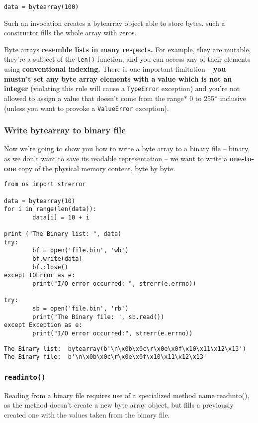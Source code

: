 \documentclass[11pt]{article}
\begin{document}
\texttt{data = bytearray(100)}

Such an invocation creates a bytearray object able to store
bytes. such a constructor fills the whole array with zeros.

Byte arrays \textbf{resemble lists in many respects.} For example, they are
mutable, they’re a subject of the \texttt{len()} function, and you can access
any of their elements using \textbf{conventional indexing.} There is one
important limitation – \textbf{you mustn’t set any byte array elements with a}
\textbf{value which is not an integer} (violating this rule will cause a
\texttt{TypeError} exception) and you’re not allowed to assign a value that
doesn’t come from the range* 0 to 255* inclusive (unless you want to
provoke a \texttt{ValueError} exception).

\subsubsection{Write bytearray to binary file}
\label{sec:org235d385}
Now we’re going to show you how to write a byte array to a binary file
– binary, as we don’t want to save its readable representation – we
want to write a \textbf{one-to-one} copy of the physical memory content, byte
by byte.

\begin{verbatim}
from os import strerror

data = bytearray(10)
for i in range(len(data)):
        data[i] = 10 + i

print ("The Binary list: ", data)
try:
        bf = open('file.bin', 'wb')
        bf.write(data)
        bf.close()
except IOError as e:
        print("I/O error occurred: ", strerr(e.errno))

try:
        sb = open('file.bin', 'rb')
        print("The Binary file: ", sb.read())
except Exception as e:
        print("I/O error occurred:", strerr(e.errno))
\end{verbatim}

\begin{verbatim}
The Binary list:  bytearray(b'\n\x0b\x0c\r\x0e\x0f\x10\x11\x12\x13')
The Binary file:  b'\n\x0b\x0c\r\x0e\x0f\x10\x11\x12\x13'
\end{verbatim}

\subsubsection{\texttt{readinto()}}
\label{sec:org37a7704}
Reading from a binary file requires use of a specialized method name
readinto(), as the method doesn’t create a new byte array object, but
fills a previously created one with the values taken from the binary
file.
\end{document}
